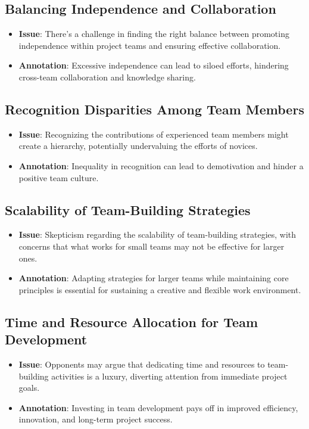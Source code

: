 \documentclass[a4paper, twoside]{article}
\begin{document}
\subsection{Balancing Independence and Collaboration}
\begin{itemize}
  \item \textbf{Issue}: There's a challenge in finding the right balance between promoting independence within project teams and ensuring effective collaboration.
  \item \textbf{Annotation}: Excessive independence can lead to siloed efforts, hindering cross-team collaboration and knowledge sharing.\cite{Tuckman1965}
\end{itemize}

\subsection{Recognition Disparities Among Team Members}
\begin{itemize}
  \item \textbf{Issue}: Recognizing the contributions of experienced team members might create a hierarchy, potentially undervaluing the efforts of novices.
  \item \textbf{Annotation}: Inequality in recognition can lead to demotivation and hinder a positive team culture.\cite{Deci2001}
\end{itemize}

\subsection{Scalability of Team-Building Strategies}
\begin{itemize}
  \item \textbf{Issue}: Skepticism regarding the scalability of team-building strategies, with concerns that what works for small teams may not be effective for larger ones.
  \item \textbf{Annotation}: Adapting strategies for larger teams while maintaining core principles is essential for sustaining a creative and flexible work environment.\cite{Hackman2002}
\end{itemize}

\subsection{Time and Resource Allocation for Team Development}
\begin{itemize}
  \item \textbf{Issue}: Opponents may argue that dedicating time and resources to team-building activities is a luxury, diverting attention from immediate project goals.
  \item \textbf{Annotation}: Investing in team development pays off in improved efficiency, innovation, and long-term project success.\cite{Katzenbach1993}
\end{itemize}
\end{document}
